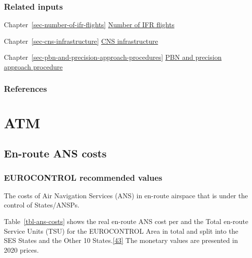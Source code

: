 \documentclass[
  11pt,
  a4paper,
]{book}
\begin{document}
\hypertarget{related-inputs-19}{%
\section{Related inputs}\label{related-inputs-19}}

Chapter~\ref{sec-number-of-ifr-flights}
\protect\hyperlink{sec-number-of-ifr-flights}{Number of IFR flights}

Chapter~\ref{sec-cns-infrastructure}
\protect\hyperlink{sec-cns-infrastructure}{CNS infrastructure}

Chapter~\ref{sec-pbn-and-precision-approach-procedures}
\protect\hyperlink{sec-pbn-and-precision-approach-procedures}{PBN and
precision approach procedure}

\hypertarget{references-25}{%
\section{References}\label{references-25}}

\part{ATM}

\hypertarget{sec-en-route-ans-costs}{%
\chapter{En-route ANS costs}\label{sec-en-route-ans-costs}}

\hypertarget{eurocontrol-recommended-values-24}{%
\section{EUROCONTROL recommended
values}\label{eurocontrol-recommended-values-24}}

The costs of Air Navigation Services (ANS) in en-route airspace that is
under the control of States/ANSPs.

Table~\ref{tbl-ans-costs} shows the real en-route ANS cost per and the
Total en-route Service Units (TSU) for the EUROCONTROL Area in total and
split into the SES States and the Other 10
States.\protect\hyperlink{ref-ectrlprr2022}{{[}43{]}} The monetary
values are presented in 2020 prices.
\end{document}
